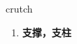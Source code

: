 
\begin{frame}
{\huge crutch}
\begin{center}
\begin{enumerate}\Large
  \item \textbf{支撑，支柱}
\end{enumerate}
\end{center}
\end{frame}

